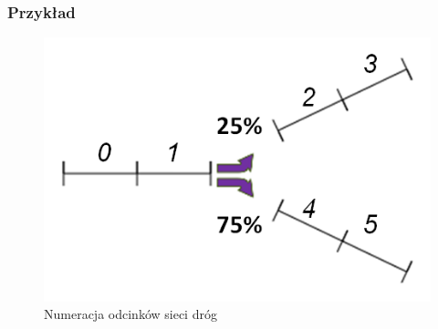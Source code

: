 \documentclass[12pt]{book}
\theoremstyle{plain}
\newcommand\cincludegraphics[2][]{\raisebox{-0.5\height}{\texttt{[image: \#2]}}}
\begin{document}
\subsubsection{Przykład}
\begin{figure}[H]
	\centering
	\includegraphics[width=13cm]{images/env_11_perc_italic}
	\caption{Numeracja odcinków sieci dróg}
	\label{fig:ctm_przyklad}\end{figure}
\def \xzero {\begin{bmatrix}
		7 \\ 4 \\ 3 \\ 0 \\ 1 \\ 5
\end{bmatrix}}
\def \A{
	\begin{bmatrix}
		0 & 0    & 0 & 0 & 0 & 0 \\
		1 & 0    & 0 & 0 & 0 & 0 \\
		0 & 0.25 & 0 & 0 & 0 & 0 \\
		0 & 0    & 1 & 0 & 0 & 0 \\
		0 & 0.75 & 0 & 0 & 0 & 0 \\
		0 & 0    & 0 & 0 & 1 & 0 
	\end{bmatrix}
}
\end{document}
